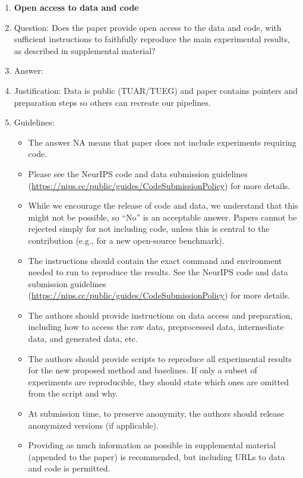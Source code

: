 \documentclass{article}
\begin{document}
\begin{enumerate}
\item {\bf Open access to data and code}
    \item[] Question: Does the paper provide open access to the data and code, with sufficient instructions to faithfully reproduce the main experimental results, as described in supplemental material?
    \item[] Answer: \answerYes{}
    \item[] Justification: Data is public (TUAR/TUEG) and paper contains pointers and preparation steps so others can recreate our pipelines.
    \item[] Guidelines:
    \begin{itemize}
        \item The answer NA means that paper does not include experiments requiring code.
        \item Please see the NeurIPS code and data submission guidelines (\url{https://nips.cc/public/guides/CodeSubmissionPolicy}) for more details.
        \item While we encourage the release of code and data, we understand that this might not be possible, so “No” is an acceptable answer. Papers cannot be rejected simply for not including code, unless this is central to the contribution (e.g., for a new open-source benchmark).
        \item The instructions should contain the exact command and environment needed to run to reproduce the results. See the NeurIPS code and data submission guidelines (\url{https://nips.cc/public/guides/CodeSubmissionPolicy}) for more details.
        \item The authors should provide instructions on data access and preparation, including how to access the raw data, preprocessed data, intermediate data, and generated data, etc.
        \item The authors should provide scripts to reproduce all experimental results for the new proposed method and baselines. If only a subset of experiments are reproducible, they should state which ones are omitted from the script and why.
        \item At submission time, to preserve anonymity, the authors should release anonymized versions (if applicable).
        \item Providing as much information as possible in supplemental material (appended to the paper) is recommended, but including URLs to data and code is permitted.
    \end{itemize}



\end{enumerate}
\end{document}
